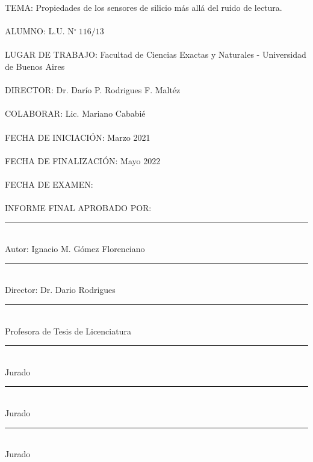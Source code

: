 \thispagestyle{empty}
\noindent TEMA: Propiedades de los sensores de silicio más allá del ruido de lectura.\\
\\
\noindent ALUMNO: L.U. N$^\circ\ 116/13$\\
\\
\noindent LUGAR DE TRABAJO: Facultad de Ciencias Exactas y Naturales - Universidad de Buenos Aires\\
\\
\noindent DIRECTOR: Dr. Darío P. Rodrigues F. Maltéz\\
\\
\noindent COLABORAR: Lic. Mariano Cababié\\
\\
\noindent FECHA DE INICIACIÓN: Marzo 2021\\
\\
\noindent FECHA DE FINALIZACIÓN:  Mayo 2022\\
\\
\noindent FECHA DE EXAMEN:\\
\\
\noindent INFORME FINAL APROBADO POR:\\
\vfill
\begin{multicols}{2}    
\rule[0pt]{2.5in}{0.5pt}\\
Autor: Ignacio M. Gómez Florenciano
\vspace{3em}

\rule[0pt]{2.5in}{0.5pt}\\
Director: Dr. Dario Rodrigues
\vspace{3em}
   
\rule[0pt]{2.5in}{0.5pt}\\
Profesora de Tesis de Licenciatura
    
\columnbreak
\rule[0pt]{2.5in}{0.5pt}\\
Jurado 
\vspace{3em}
    
\rule[0pt]{2.5in}{0.5pt}\\
Jurado 
\vspace{3em}
    
\rule[0pt]{2.5in}{0.5pt}\\
Jurado 
\end{multicols}  
\newpage
\thispagestyle{empty} \mbox{}
\thispagestyle{empty}
